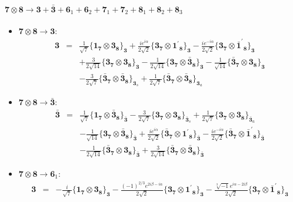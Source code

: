 \documentclass[english]{article}
\newcommand{\subcg}[3]{\big\{ {#1}\otimes{#2}\big\}^{}_{#3}}
\newcommand{\rep}[1]{\mathbf{#1}}
\begin{document}
\paragraph*{\Large $\rep{7}\otimes\rep{8}\to\rep{3}+\rep{\bar{3}}+\rep{6}_{1}+\rep{6}_{2}+\rep{7}_{1}+\rep{7}_{2}+\rep{8}_{1}+\rep{8}_{2}+\rep{8}_{3}$}
\begin{itemize}
\item $\rep{7}\otimes\rep{8}\to\rep{3}$:
\begin{eqnarray*}
\rep{3} &=& \frac{1}{\sqrt{7}}\subcg{\rep{1}_{\rep{7}}}{\rep{3}_{\rep{8}}}{\rep{3}}+\frac{i e^{i \alpha }}{2 \sqrt{2}}\subcg{\rep{3}_{\rep{7}}}{\rep{1^{\prime}}_{\rep{8}}}{\rep{3}}-\frac{i e^{-i \alpha }}{2 \sqrt{2}}\subcg{\rep{3}_{\rep{7}}}{\rep{\bar{1}^{\prime}}_{\rep{8}}}{\rep{3}} \\ 
 & & +\frac{3}{2 \sqrt{14}}\subcg{\rep{3}_{\rep{7}}}{\rep{3}_{\rep{8}}}{\rep{3}}-\frac{1}{2 \sqrt{14}}\subcg{\rep{3}_{\rep{7}}}{\rep{\bar{3}}_{\rep{8}}}{\rep{3}}-\frac{1}{\sqrt{14}}\subcg{\rep{\bar{3}}_{\rep{7}}}{\rep{3}_{\rep{8}}}{\rep{3}} \\ 
 & & -\frac{3}{2 \sqrt{7}}\subcg{\rep{\bar{3}}_{\rep{7}}}{\rep{\bar{3}}_{\rep{8}}}{\rep{3}_{s}}+\frac{1}{2 \sqrt{7}}\subcg{\rep{\bar{3}}_{\rep{7}}}{\rep{\bar{3}}_{\rep{8}}}{\rep{3}_{a}}
\end{eqnarray*}
\item $\rep{7}\otimes\rep{8}\to\rep{\bar{3}}$:
\begin{eqnarray*}
\rep{\bar{3}} &=& \frac{1}{\sqrt{7}}\subcg{\rep{1}_{\rep{7}}}{\rep{\bar{3}}_{\rep{8}}}{\rep{\bar{3}}}-\frac{3}{2 \sqrt{7}}\subcg{\rep{3}_{\rep{7}}}{\rep{3}_{\rep{8}}}{\rep{\bar{3}}_{s}}+\frac{1}{2 \sqrt{7}}\subcg{\rep{3}_{\rep{7}}}{\rep{3}_{\rep{8}}}{\rep{\bar{3}}_{a}} \\ 
 & & -\frac{1}{\sqrt{14}}\subcg{\rep{3}_{\rep{7}}}{\rep{\bar{3}}_{\rep{8}}}{\rep{\bar{3}}}+\frac{i e^{i \alpha }}{2 \sqrt{2}}\subcg{\rep{\bar{3}}_{\rep{7}}}{\rep{1^{\prime}}_{\rep{8}}}{\rep{\bar{3}}}-\frac{i e^{-i \alpha }}{2 \sqrt{2}}\subcg{\rep{\bar{3}}_{\rep{7}}}{\rep{\bar{1}^{\prime}}_{\rep{8}}}{\rep{\bar{3}}} \\ 
 & & -\frac{1}{2 \sqrt{14}}\subcg{\rep{\bar{3}}_{\rep{7}}}{\rep{3}_{\rep{8}}}{\rep{\bar{3}}}+\frac{3}{2 \sqrt{14}}\subcg{\rep{\bar{3}}_{\rep{7}}}{\rep{\bar{3}}_{\rep{8}}}{\rep{\bar{3}}}
\end{eqnarray*}
\item $\rep{7}\otimes\rep{8}\to\rep{6}_{1}$:
\begin{eqnarray*}
\rep{3} &=& -\frac{i}{\sqrt{7}}\subcg{\rep{1}_{\rep{7}}}{\rep{3}_{\rep{8}}}{\rep{3}}-\frac{(-1)^{2/3} e^{2 i \beta -i \alpha }}{2 \sqrt{2}}\subcg{\rep{3}_{\rep{7}}}{\rep{1^{\prime}}_{\rep{8}}}{\rep{3}}-\frac{\sqrt[3]{-1} e^{i \alpha -2 i \beta }}{2 \sqrt{2}}\subcg{\rep{3}_{\rep{7}}}{\rep{\bar{1}^{\prime}}_{\rep{8}}}{\rep{3}} \\ 

\end{eqnarray*}
\end{itemize}
\end{document}
